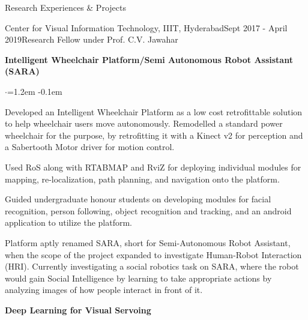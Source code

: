 \documentclass{resume}
\begin{document}
\begin{rSection}{Research Experiences \& Projects}

\begin{rSubsection}{Center for Visual Information Technology, IIIT, Hyderabad}{Sept 2017 - April 2019}{Research Fellow under Prof. C.V. Jawahar}{}

{\textbullet \hspace{0.1em} \textbf{Intelligent Wheelchair Platform/Semi Autonomous Robot Assistant (SARA)}}

\vspace*{-0.2em}
\begin{list}{$\cdot$}{\leftmargin=1.2em}
\itemsep-0.1em 
\item Developed an Intelligent Wheelchair Platform as a low cost retrofittable solution to help wheelchair users move autonomously.
Remodelled a standard power wheelchair for the purpose, by retrofitting it with a Kinect v2 for perception and a Sabertooth Motor driver for motion control.
\item Used RoS along with RTABMAP and RviZ for deploying individual modules for mapping, re-localization, path planning, and navigation onto the platform. 
\item Guided undergraduate honour students on developing modules for facial recognition, person following, object recognition and tracking, and an android application to utilize the platform.
\item Platform aptly renamed SARA, short for Semi-Autonomous Robot Assistant, when the scope of the project expanded to investigate Human-Robot Interaction (HRI). Currently investigating a social robotics task on SARA, where the robot would gain Social Intelligence by learning to take appropriate actions by analyzing images of how people interact in front of it.
\end{list}

{\textbullet \hspace{0.1em} \textbf{Deep Learning for Visual Servoing}}


\end{rSubsection}
\end{rSection}
\end{document}
